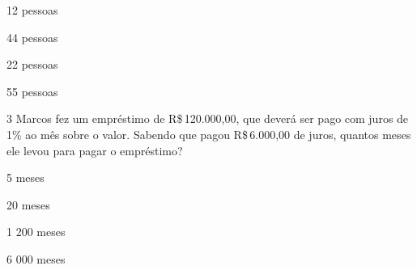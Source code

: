 \begin{escolha}[itemsep=0pt]
\item 12 pessoas
\item 44 pessoas
\item 22 pessoas
\item 55 pessoas
\end{escolha}











\num{3} Marcos fez um empréstimo de R\$\,120.000,00, que deverá ser pago com
juros de 1\% ao mês sobre o valor. Sabendo que pagou R\$\,6.000,00 de
juros, quantos meses ele levou para pagar o empréstimo?

\begin{escolha}[itemsep=0pt]
\item 5 meses
\item 20 meses
\item 1 200 meses
\item 6 000 meses
\end{escolha}



